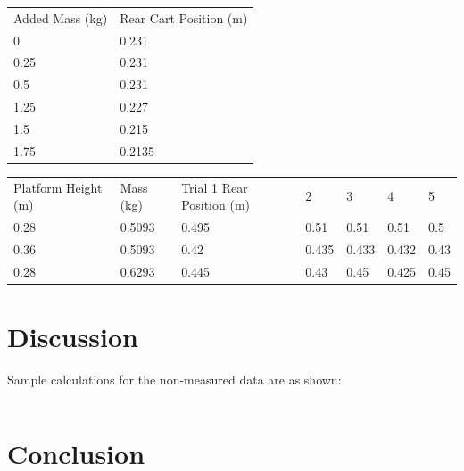 \documentclass[11pt, titlepage]{article}
\begin{document}
\begin{center}
\begin{tabular}
{|m{15em}|m{15em}|}
Added Mass (kg) & Rear Cart Position (m) \\
0 & 0.231 \\
0.25 & 0.231 \\
0.5 & 0.231 \\
1.25 & 0.227 \\
1.5 & 0.215 \\
1.75 & 0.2135 \\
\end{tabular}

\begin{tabular}
{|m{5em}|m{5em}|m{5em}|m{5em}|m{5em}|m{5em}|m{5em}|}
Platform Height (m) & Mass (kg) & Trial 1 Rear Position (m) & 2 & 3 & 4 & 5 \\
0.28 & 0.5093 & 0.495 & 0.51 & 0.51 & 0.51 & 0.5 \\
0.36 & 0.5093 & 0.42 & 0.435 & 0.433 & 0.432 & 0.43 \\
0.28 & 0.6293 & 0.445 & 0.43 & 0.45 & 0.425 & 0.45 \\
\end{tabular}
\end{center}

\section*{Discussion}
Sample calculations for the non-measured data are as shown:

\begin{center}
\begin{tabular}
{|m{8em}|m{8em}|m{8em}|m{8em}|}
\end{tabular}
\end{center}

\section*{Conclusion}
\end{document}
